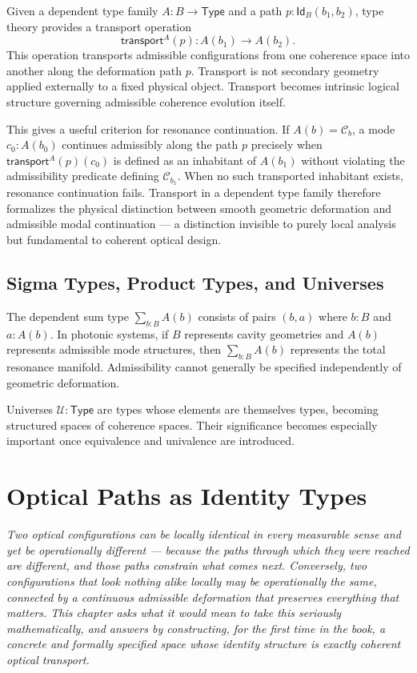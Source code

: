 \documentclass[11pt,openany]{book}
\theoremstyle{definition}
\theoremstyle{plain}
\newcommand{\Type}{\mathsf{Type}}
\newcommand{\idtype}{\mathsf{Id}}
\newcommand{\transport}{\mathsf{transport}}
\begin{document}
Given a dependent type family $A : B \to \Type$ and a path $p : \idtype_B(b_1,b_2)$, type theory provides a transport operation
\[
\transport^A(p) : A(b_1) \to A(b_2).
\]
This operation transports admissible configurations from one coherence space into another along the deformation path $p$. Transport is not secondary geometry applied externally to a fixed physical object. Transport becomes intrinsic logical structure governing admissible coherence evolution itself.

This gives a useful criterion for resonance continuation. If $A(b) = \mathcal{C}_b$, a mode $c_0 : A(b_0)$ continues admissibly along the path $p$ precisely when $\transport^A(p)(c_0)$ is defined as an inhabitant of $A(b_1)$ without violating the admissibility predicate defining $\mathcal{C}_{b_1}$. When no such transported inhabitant exists, resonance continuation fails. Transport in a dependent type family therefore formalizes the physical distinction between smooth geometric deformation and admissible modal continuation --- a distinction invisible to purely local analysis but fundamental to coherent optical design.

\section{Sigma Types, Product Types, and Universes}

The dependent sum type $\sum_{b:B} A(b)$ consists of pairs $(b,a)$ where $b : B$ and $a : A(b)$. In photonic systems, if $B$ represents cavity geometries and $A(b)$ represents admissible mode structures, then $\sum_{b:B} A(b)$ represents the total resonance manifold. Admissibility cannot generally be specified independently of geometric deformation.

Universes $\mathcal{U} : \Type$ are types whose elements are themselves types, becoming structured spaces of coherence spaces. Their significance becomes especially important once equivalence and univalence are introduced.


\chapter{Optical Paths as Identity Types}

\noindent\textit{Two optical configurations can be locally identical in every measurable sense and yet be operationally different --- because the paths through which they were reached are different, and those paths constrain what comes next. Conversely, two configurations that look nothing alike locally may be operationally the same, connected by a continuous admissible deformation that preserves everything that matters. This chapter asks what it would mean to take this seriously mathematically, and answers by constructing, for the first time in the book, a concrete and formally specified space whose identity structure is exactly coherent optical transport.}
\end{document}
